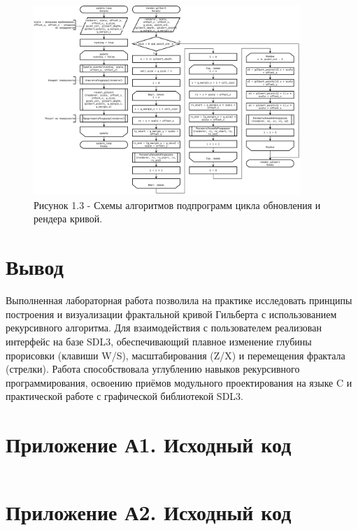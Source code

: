 \documentclass[oneside,a4paper,14pt]{extarticle}
\begin{document}
\clearpage
\begin{figure}[H]
	\centering
	\includegraphics[width=0.9\textwidth]{pics/flowchart3.png}
	\caption*{Рисунок 1.3 - Схемы алгоритмов подпрограмм цикла обновления и рендера кривой.}
\end{figure}

\section*{Вывод}

Выполненная лабораторная работа позволила на практике исследовать принципы построения и визуализации фрактальной кривой Гильберта с использованием рекурсивного алгоритма. Для взаимодействия с пользователем реализован интерфейс на базе SDL3, обеспечивающий плавное изменение глубины прорисовки (клавиши W/S), масштабирования (Z/X) и перемещения фрактала (стрелки). Работа способствовала углублению навыков рекурсивного программирования, освоению приёмов модульного проектирования на языке C и практической работе с графической библиотекой SDL3.
 

\newpage


\section*{Приложение А1. Исходный код}
\inputminted{c}{code/src/main.c}

\section*{Приложение А2. Исходный код}
\inputminted{c}{code/src/args_parser.h}
\end{document}
